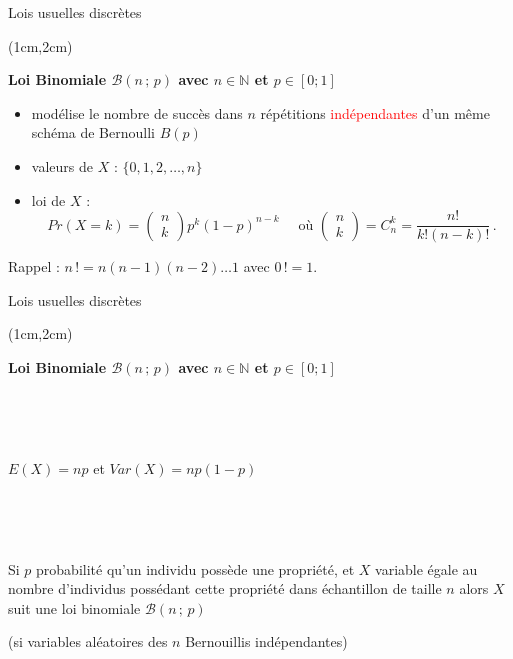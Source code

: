 \documentclass{beamer}
\begin{document}

\begin{frame}{Lois usuelles discrètes}

\begin{textblock*}{\textwidth}(1cm,2cm)
\begin{center}{\bf \Large Loi Binomiale $\mathcal{B}(n\,;\,p)$ avec $n\in\mathbb{N}$ et $p\in[0;1]$} \end{center}
\begin{itemize}
\item  modélise le nombre de succès  dans $n$  répétitions  \textcolor{red}{indépendantes} d'un même schéma de Bernoulli $B(p)$
 \item  valeurs de $X$ : $\{0,1,2,\hdots,n\}$ 
 \item   loi de $X$ :
$$
Pr(X=k)=\begin{pmatrix}n\\k\end{pmatrix} p^k (1-p)^{n-k}\quad {\mbox { o\`u }} \begin{pmatrix}n\\k\end{pmatrix}= C_n^k=\frac{n!}{k!(n-k)!}\,.
$$
\end{itemize}

\noindent Rappel : $n\,!=n(n-1)(n-2)\hdots 1$ avec $0\, !=1$.



\end{textblock*}

\end{frame}


\begin{frame}{Lois usuelles discrètes}

\begin{textblock*}{\textwidth}(1cm,2cm)
\begin{center}{\bf \Large Loi Binomiale $\mathcal{B}(n\,;\,p)$ avec $n\in\mathbb{N}$ et $p\in[0;1]$} \end{center}

\
 
 \

\noindent $E(X)=np$ et $Var(X)=np(1-p)$

\
 
 \



Si  $p$ probabilité qu'un individu possède une propriété, et $X$ variable  égale au nombre d'individus possédant cette propriété dans  échantillon de taille $n$ alors $X$ suit une loi binomiale $\mathcal{B}(n\,;\,p)$

(si variables aléatoires des $n$ Bernouillis indépendantes)

 
 




\end{textblock*}

\end{frame}
\end{document}
